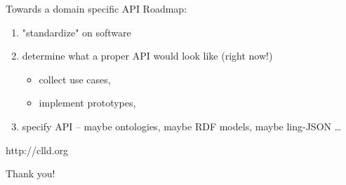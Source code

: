 \documentclass{beamer}
\begin{document}
\begin{frame}{Towards a domain specific API}
Roadmap:

\begin{enumerate}
\item "standardize" on software
\item determine what a proper API would look like (right now!)
\begin{itemize}
\item collect use cases,
\item implement prototypes,
\end{itemize}
\item specify API -- maybe ontologies, maybe RDF models, maybe ling-JSON \dots
\end{enumerate}
\end{frame}



\begin{frame}{}
\begin{center}
http://clld.org
\end{center}
\vskip 0.5cm
\begin{center}
Thank you!
\end{center}
\end{frame}
\end{document}
